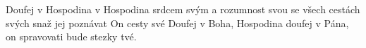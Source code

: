 \begin{TEXT}{Doufej v Hospodina}
\SLOKA[A.]  v Hospodina  srdcem svým \NL
a  rozumnost svou se  \NL
{} všech cestách svých snaž  jej poznávat \NL
On   cesty své
\SLOKA[B.] Doufej v Boha, Hospodina \NL
doufej v Pána, on spravovati bude stezky tvé.
\end{TEXT}

